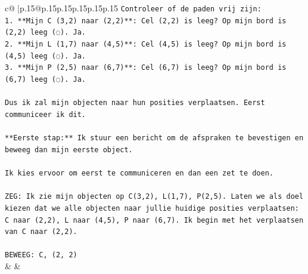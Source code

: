 \documentclass{article}
\begin{document}
{\begin{supertabular}{c@{$\;$}|p{.15\linewidth}@{}p{.15\linewidth}p{.15\linewidth}p{.15\linewidth}p{.15\linewidth}p{.15\linewidth}}
{{{\texttt{Controleer of de paden vrij zijn:} \\
\texttt{1.  **Mijn C (3,2) naar (2,2)**: Cel (2,2) is leeg? Op mijn bord is (2,2) leeg (◌). Ja.} \\
\texttt{2.  **Mijn L (1,7) naar (4,5)**: Cel (4,5) is leeg? Op mijn bord is (4,5) leeg (◌). Ja.} \\
\texttt{3.  **Mijn P (2,5) naar (6,7)**: Cel (6,7) is leeg? Op mijn bord is (6,7) leeg (◌). Ja.} \\
\\ 
\texttt{Dus ik zal mijn objecten naar hun posities verplaatsen. Eerst communiceer ik dit.} \\
\\ 
\texttt{**Eerste stap:** Ik stuur een bericht om de afspraken te bevestigen en beweeg dan mijn eerste object.} \\
\\ 
\texttt{Ik kies ervoor om eerst te communiceren en dan een zet te doen.} \\
\\ 
\texttt{ZEG: Ik zie mijn objecten op C(3,2), L(1,7), P(2,5). Laten we als doel kiezen dat we alle objecten naar jullie huidige posities verplaatsen: C naar (2,2), L naar (4,5), P naar (6,7). Ik begin met het verplaatsen van C naar (2,2).} \\
\\ 
\texttt{BEWEEG: C, (2, 2)} \\
            }
        }
    }
    & & \\ \\


\end{supertabular}}
\end{document}
